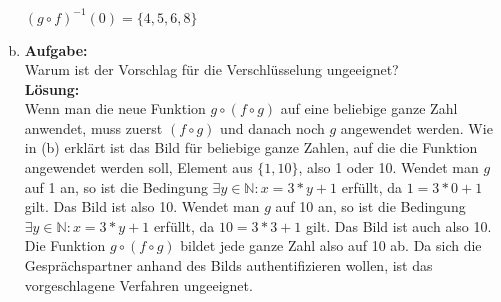 \documentclass[11pt, a4paper]{article}
\begin{document}
\begin{enumerate}[(a)]
    $(g \circ f)^{-1}(0) = \{4, 5, 6, 8\}$\\
    \item {\bfseries Aufgabe:\\}
    Warum ist der Vorschlag für die Verschlüsselung ungeeignet?\\
    {\bfseries Lösung:\\}
    Wenn man die neue Funktion $g \circ (f \circ g)$ auf eine beliebige ganze Zahl anwendet, muss zuerst $(f \circ g)$ und danach noch $g$ angewendet werden.
    Wie in (b) erklärt ist das Bild für beliebige ganze Zahlen, auf die die Funktion angewendet werden soll, Element aus $\{1, 10\}$, also 1 oder 10.
    Wendet man $g$ auf 1 an, so ist die Bedingung $\exists y \in \mathbb{N} : x = 3 * y + 1$ erfüllt, da $1 = 3*0 + 1$ gilt. Das Bild ist also 10.
    Wendet man $g$ auf 10 an, so ist die Bedingung $\exists y \in \mathbb{N} : x = 3 * y + 1$ erfüllt, da $10 = 3*3 + 1$ gilt. Das Bild ist auch also 10.
    Die Funktion $g \circ (f \circ g)$ bildet jede ganze Zahl also auf 10 ab. Da sich die Gesprächspartner anhand des Bilds authentifizieren wollen, ist das vorgeschlagene Verfahren ungeeignet.\\
\end{enumerate}
\end{document}
